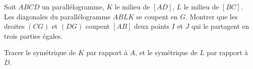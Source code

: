 \begin{exo}
Soit $ABCD$ un parallélogramme, $K$ le milieu de $[AD]$, $L$ le milieu de $[BC]$.
Les diagonales du parallélogramme $ABLK$ se coupent en $G$.
Montrer que les droites $(CG)$ et $(DG)$ coupent $[AB]$ deux points $I$ et $J$ qui le partagent en trois parties égales.
\begin{center}
\end{center}
\begin{hint}
Tracer le symétrique de $K$ par rapport à $A$, et le symétrique de $L$ par rapport à $D$.
\end{hint}
\end{exo}




